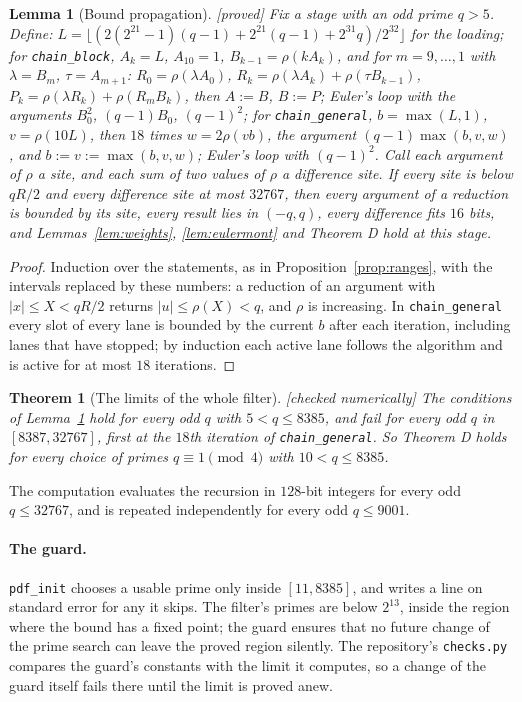 \documentclass[10pt,a4paper]{article}
\newcommand{\code}[1]{\texttt{#1}}
\newcommand{\stproved}{\textsf{\small[proved]}\xspace}
\newcommand{\stnum}{\textsf{\small[checked numerically]}\xspace}
\theoremstyle{plain}
\newtheorem{lemma}[proposition]{Lemma}
\newtheorem{theorem}[proposition]{Theorem}
\theoremstyle{definition}
\begin{document}
\begin{lemma}[Bound propagation]\label{lem:propagation}\stproved
Fix a stage with an odd prime $q>5$.  Define: $L=\lfloor(2(2^{21}-1)(q-1)+2^{21}(q-1)+2^{31}q)/2^{32}\rfloor$ for the loading; for \code{chain\_block},
$A_k=L$, $A_{10}=1$, $B_{k-1}=\rho(kA_k)$, and for $m=9,\dots,1$ with $\lambda=B_m$, $\tau=A_{m+1}$: $R_0=\rho(\lambda A_0)$, $R_k=\rho(\lambda A_k)+\rho(\tau B_{k-1})$,
$P_k=\rho(\lambda R_k)+\rho(R_mB_k)$, then $A:=B$, $B:=P$; Euler's loop with the arguments $B_0^2$, $(q-1)B_0$, $(q-1)^2$; for \code{chain\_general}, $b=\max(L,1)$,
$v=\rho(10L)$, then $18$ times $w=2\rho(vb)$, the argument $(q-1)\max(b,v,w)$, and $b:=v:=\max(b,v,w)$; Euler's loop with $(q-1)^2$.  Call each argument of $\rho$ a
\emph{site}, and each sum of two values of $\rho$ a \emph{difference site}.  If every site is below $qR/2$ and every difference site at most $32767$, then every
argument of a reduction is bounded by its site, every result lies in $(-q,q)$, every difference fits $16$ bits, and Lemmas~\ref{lem:weights}, \ref{lem:eulermont}
and Theorem D hold at this stage.
\end{lemma}
\begin{proof}
Induction over the statements, as in Proposition~\ref{prop:ranges}, with the intervals replaced by these numbers: a reduction of an argument with $|x|\le X<qR/2$
returns $|u|\le\rho(X)<q$, and $\rho$ is increasing.  In \code{chain\_general} every slot of every lane is bounded by the current $b$ after each iteration, including
lanes that have stopped; by induction each active lane follows the algorithm and is active for at most $18$ iterations.
\end{proof}

\begin{theorem}[The limits of the whole filter]\label{thm:limits}\stnum
The conditions of Lemma~\ref{lem:propagation} hold for every odd $q$ with $5<q\le8385$, and fail for every odd $q$ in $[8387,32767]$, first at the $18$th iteration
of \code{chain\_general}.  So Theorem D holds for every choice of primes $q\equiv1\pmod4$ with $10<q\le8385$.
\end{theorem}
The computation evaluates the recursion in $128$-bit integers for every odd $q\le32767$, and is repeated independently for every odd $q\le9001$.

\paragraph{The guard.}  \code{pdf\_init} chooses a usable prime only inside $[11,8385]$, and writes a line on standard error for any it skips.  The filter's
primes are below $2^{13}$, inside the region where the bound has a fixed point; the guard ensures that no future change of the prime search can leave the proved
region silently.  The repository's \code{checks.py} compares the guard's constants with the limit it computes, so a change of the guard itself fails there until
the limit is proved anew.
\end{document}
